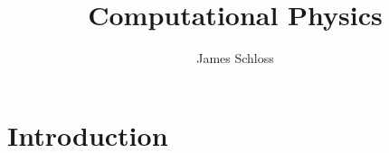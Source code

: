 \documentclass[11pt]{book}
\title{\textbf{Computational Physics}}
\author{James Schloss}
\date{}
\begin{document}
\maketitle

\section*{Introduction}


\end{document}
